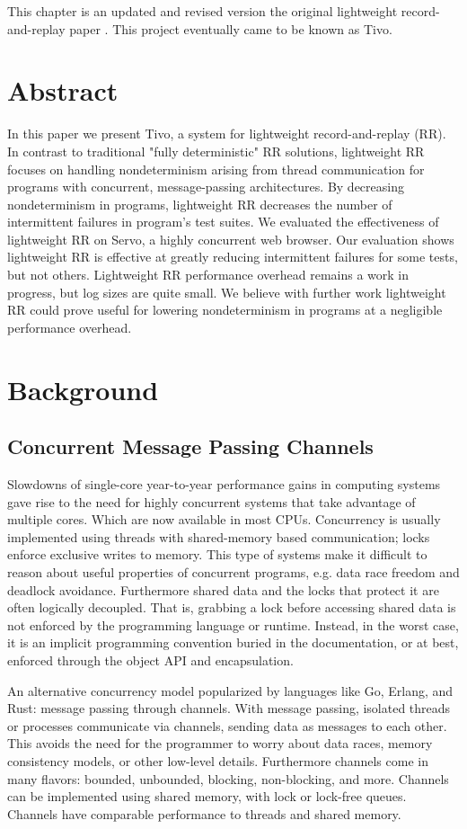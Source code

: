 This chapter is an updated and revised version the original lightweight record-and-replay paper \citep{tivo}. This project eventually came to be known as Tivo.
\section{Abstract}
     In this paper we present Tivo, a system for lightweight record-and-replay (RR). In contrast to traditional "fully deterministic" RR solutions, lightweight RR focuses on handling nondeterminism arising from thread communication for programs with concurrent, message-passing architectures. By decreasing nondeterminism in programs, lightweight RR decreases the number of intermittent failures in program's test suites. We evaluated the effectiveness of lightweight RR on Servo, a highly concurrent web browser. Our evaluation shows lightweight RR is effective at greatly reducing intermittent failures for some tests, but not others. Lightweight RR performance overhead remains a work in progress, but log sizes are quite small. We believe with further work lightweight RR could prove useful for lowering nondeterminism in programs at a negligible performance overhead.
\section{Background}

\subsection{Concurrent Message Passing Channels}
Slowdowns of single-core year-to-year performance gains in computing systems gave rise to the need for highly concurrent systems that take advantage of multiple cores. Which are now available
in most CPUs. Concurrency is usually implemented using threads with shared-memory based communication; locks enforce exclusive writes to memory. This type of systems make it difficult to reason about useful properties of concurrent programs, e.g. data race freedom and deadlock avoidance. Furthermore shared data and the locks that protect it are often logically decoupled. That is, grabbing a lock before accessing shared data is not enforced by the programming language or runtime. Instead, in the worst case, it is an implicit programming convention buried in the documentation, or at best, enforced through the object API and encapsulation.

An alternative concurrency model popularized by languages like Go, Erlang, and Rust: message passing through channels. With message passing, isolated threads or processes communicate via channels, sending data as messages to each other. This avoids the need for the programmer to worry about data races, memory consistency models, or other low-level details. Furthermore channels come in many flavors: bounded, unbounded, blocking, non-blocking, and more. Channels can be implemented using
shared memory, with lock or lock-free queues. Channels have comparable performance to threads and shared memory.

